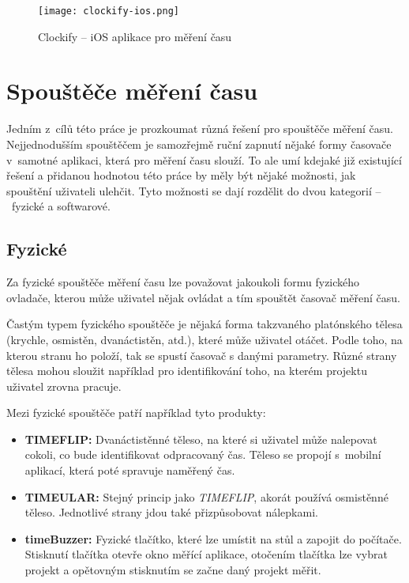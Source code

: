 \begin{figure}[h]
	\centering
	\texttt{[image: clockify-ios.png]}
	\caption{Clockify – iOS aplikace pro měření času \cite{clockify-ios}}
	\label{fig:clockify-ios}
\end{figure}

\section{Spouštěče měření času}

Jedním z~cílů této práce je prozkoumat různá řešení pro spouštěče měření času. Nejjednodušším spouštěčem je samozřejmě ruční zapnutí nějaké formy časovače v~samotné aplikaci, která pro měření času slouží. To ale umí kdejaké již existující řešení a přidanou hodnotou této práce by měly být nějaké možnosti, jak spouštění uživateli ulehčit. Tyto možnosti se dají rozdělit do dvou kategorií – fyzické a softwarové.

\subsection{Fyzické}

Za fyzické spouštěče měření času lze považovat jakoukoli formu fyzického ovladače, kterou může uživatel nějak ovládat a tím spouštět časovač měření času.

Častým typem fyzického spouštěče je nějaká forma takzvaného platónského tělesa (krychle, osmistěn, dvanáctistěn, atd.), které může uživatel otáčet. Podle toho, na kterou stranu ho položí, tak se spustí časovač s danými parametry. Různé strany tělesa mohou sloužit například pro identifikování toho, na kterém projektu uživatel zrovna pracuje.

Mezi fyzické spouštěče patří například tyto produkty:
\begin{itemize}
\item\textbf{TIMEFLIP:} Dvanáctistěnné těleso, na které si uživatel může nalepovat cokoli, co bude identifikovat odpracovaný čas. Těleso se propojí s~mobilní aplikací, která poté spravuje naměřený čas. \cite{timeflip}
\item\textbf{TIMEULAR:} Stejný princip jako \emph{TIMEFLIP}, akorát používá osmistěnné těleso. Jednotlivé strany jdou také přizpůsobovat nálepkami. \cite{timeular}
\item\textbf{timeBuzzer:} Fyzické tlačítko, které lze umístit na stůl a zapojit do počítače. Stisknutí tlačítka otevře okno měřící aplikace, otočením tlačítka lze vybrat projekt a opětovným stisknutím se začne daný projekt měřit. \cite{timebuzzer}
\end{itemize}

